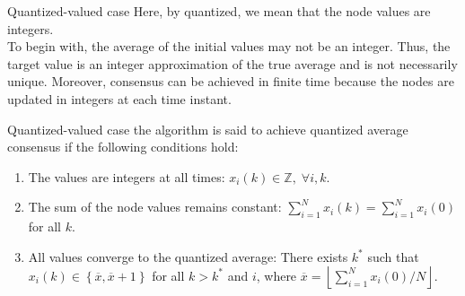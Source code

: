 \documentclass[xcolor={dvipsnames}]{beamer}
\begin{document}

	\begin{frame}{Quantized-valued case}
		Here, by quantized, we mean that the node values are integers.\\
		To begin with, the average of the initial values may not be an integer.
		Thus, the target value is an integer approximation of the true average and is not
		necessarily unique. Moreover, consensus can be achieved in finite time because
		the nodes are updated in integers at each time instant.
	\end{frame}
	
	\begin{frame}{Quantized-valued case}
		the algorithm is said to achieve quantized average consensus if
		the following conditions hold:
		\begin{enumerate}[label=(\roman*)]
			\item The values are integers at all times: $x_{i}(k)\in \mathbb{Z}, \; \forall{i, k}$.
			\item The sum of the node values remains constant:
			$\sum_{i=1}^{N}x_{i}(k)=\sum_{i=1}^{N}x_{i}(0)$ for all $k$.
			\item All values converge to the quantized average: There exists $k^{*}$ such that 
			$x_{i}(k)\in \left\{ \overline{x}, \overline{x}+1 \right\}$ 
			for all $k > k^{*}$ 
			and $i$, where 
			$\overline{x}=\left\lfloor \sum_{i=1}^{N}x_{i}(0)/N \right\rfloor$.
		\end{enumerate}
	\end{frame}
	
\end{document}
